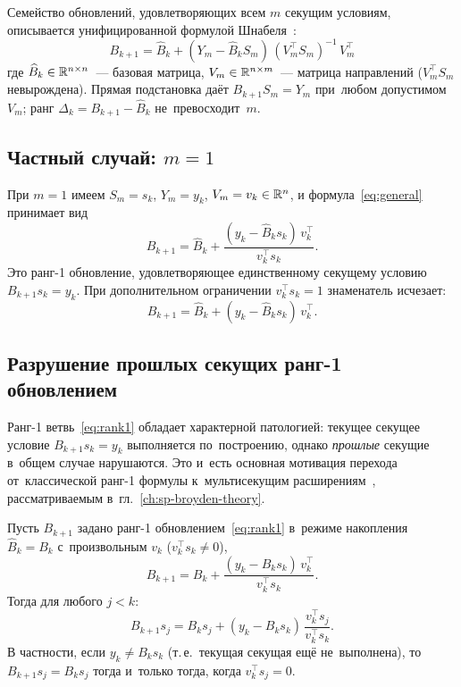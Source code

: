 Семейство обновлений, удовлетворяющих всем $m$ секущим условиям,
описывается унифицированной формулой
Шнабеля~\cite[ур.~(2.5)]{schnabel1983}:
\begin{equation}\label{eq:general}
  \boxed{
    B_{k+1} = \widehat{B}_k + (Y_m - \widehat{B}_k S_m)\,(V_m^\top S_m)^{-1}\,V_m^\top
  }
\end{equation}
где $\widehat{B}_k \in \mathbb{R}^{n \times n}$~--- базовая матрица,
$V_m \in \mathbb{R}^{n \times m}$~--- матрица направлений
($V_m^\top S_m$ невырождена). Прямая подстановка даёт
$B_{k+1} S_m = Y_m$ при~любом допустимом~$V_m$; ранг
$\Delta_k = B_{k+1}-\widehat{B}_k$ не~превосходит~$m$.

\subsection*{Частный случай: $m = 1$}

При $m = 1$ имеем $S_m = s_k$, $Y_m = y_k$, $V_m = v_k \in \mathbb{R}^n$,
и формула~\eqref{eq:general} принимает вид
\begin{equation}\label{eq:rank1}
  B_{k+1} = \widehat{B}_k + \frac{(y_k - \widehat{B}_k s_k)\,v_k^\top}{v_k^\top s_k}.
\end{equation}
Это ранг-1 обновление, удовлетворяющее единственному секущему условию
$B_{k+1} s_k = y_k$. При дополнительном ограничении $v_k^\top s_k = 1$
знаменатель исчезает:
\begin{equation}\label{eq:rank1_normalized}
  B_{k+1} = \widehat{B}_k + (y_k - \widehat{B}_k s_k)\,v_k^\top.
\end{equation}

\subsection*{Разрушение прошлых секущих ранг-1 обновлением}\label{sec:rank1_destruction}

Ранг-1 ветвь~\eqref{eq:rank1} обладает характерной патологией:
текущее секущее условие $B_{k+1}s_k = y_k$ выполняется по~построению, однако
\emph{прошлые} секущие в~общем случае нарушаются. Это и~есть основная
мотивация перехода от~классической ранг-1 формулы к~мультисекущим
расширениям~\cite{schnabel1983,gay_schnabel1978}, рассматриваемым
в~гл.~\ref{ch:sp-broyden-theory}.

\begin{proposition}\label{prop:destruction}
Пусть $B_{k+1}$ задано ранг-1 обновлением~\eqref{eq:rank1} в~режиме
накопления $\widehat{B}_k = B_k$ с~произвольным $v_k$ ($v_k^\top s_k \neq 0$),
\[
  B_{k+1} = B_k + \frac{(y_k - B_k s_k)\,v_k^\top}{v_k^\top s_k}.
\]
Тогда для любого $j < k$:
\[
  B_{k+1} s_j = B_k s_j + (y_k - B_k s_k)\,\frac{v_k^\top s_j}{v_k^\top s_k}.
\]
В частности, если $y_k \neq B_k s_k$ (т.\,е.\ текущая секущая ещё не~выполнена),
то $B_{k+1} s_j = B_k s_j$ тогда и~только тогда, когда $v_k^\top s_j = 0$.
\end{proposition}

